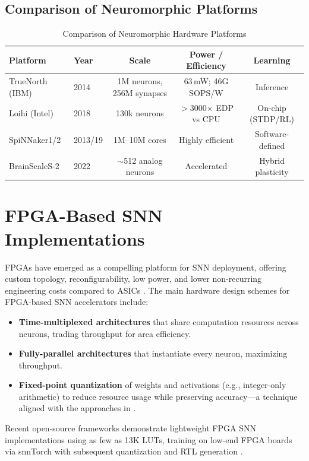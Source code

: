 \documentclass[12pt,a4paper]{article}
\begin{document}
\subsection{Comparison of Neuromorphic Platforms}
\begin{table}[h]
\centering
\caption{Comparison of Neuromorphic Hardware Platforms}
\label{tab:platforms}
\begin{tabular}{@{}llccc@{}}
\toprule
\textbf{Platform} & \textbf{Year} & \textbf{Scale} & \textbf{Power / Efficiency} & \textbf{Learning} \\
\midrule
TrueNorth (IBM)   & 2014 & 1M neurons, 256M synapses & 63\,mW; 46G SOPS/W & Inference \\
Loihi (Intel)     & 2018 & 130k neurons & $>$3000$\times$ EDP vs CPU & On-chip (STDP/RL) \\
SpiNNaker1/2      & 2013/19 & 1M--10M cores & Highly efficient & Software-defined \\
BrainScaleS-2     & 2022 & $\sim$512 analog neurons & Accelerated & Hybrid plasticity \\
\bottomrule
\end{tabular}
\end{table}

\section{FPGA-Based SNN Implementations}
\label{sec:fpga}
FPGAs have emerged as a compelling platform for SNN deployment, offering custom topology, reconfigurability, low power, and lower non-recurring engineering costs compared to ASICs \cite{Isik2023,Guo2017}. The main hardware design schemes for FPGA-based SNN accelerators include:
\begin{itemize}
    \item \textbf{Time-multiplexed architectures} that share computation resources across neurons, trading throughput for area efficiency.
    \item \textbf{Fully-parallel architectures} that instantiate every neuron, maximizing throughput.
    \item \textbf{Fixed-point quantization} of weights and activations (e.g., integer-only arithmetic) to reduce resource usage while preserving accuracy---a technique aligned with the approaches in \cite{Guo2017,Fang2023}.
\end{itemize}
Recent open-source frameworks demonstrate lightweight FPGA SNN implementations using as few as 13K LUTs, training on low-end FPGA boards via snnTorch with subsequent quantization and RTL generation \cite{SnnFPGA2025}.
\end{document}
